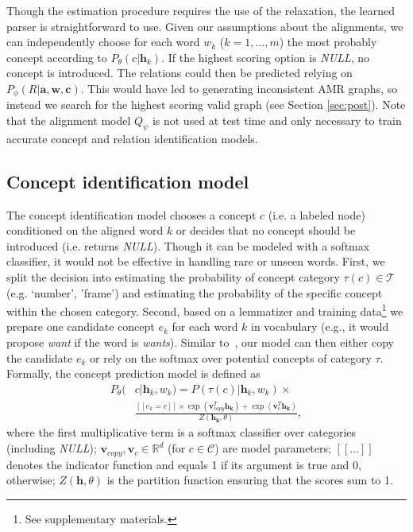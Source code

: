 \documentclass[11pt,a4paper]{article}
\begin{document}
Though the estimation procedure requires the use of the relaxation, the learned parser is straightforward to use. Given our assumptions about the alignments, we can independently choose for each word $w_k$ ($k = 1, \ldots, m$) the most probably concept according to $P_\theta(c| \mathbf{h}_{k})$. If the highest scoring option is {\it NULL}, no concept is introduced. The relations could then be predicted relying on $P_\phi(R | \mathbf{a}, \mathbf{w}, \mathbf{c})$. This would have led to generating inconsistent AMR graphs, so instead we search for the highest scoring valid graph (see Section  \ref{sec:post}). Note that the alignment model $Q_\psi$ is not used at test time and only necessary to train accurate concept and relation identification models.



\subsection{Concept identification model}
\label{sect:concept-ident}

The concept identification model chooses a concept $c$ (i.e. a labeled node) conditioned on the aligned word $k$ or decides that no concept should be introduced (i.e. returns \textit{NULL}). Though it can be modeled with a softmax classifier, it would not be effective in handling rare or unseen words. First, we split the decision into estimating the probability of concept category $\tau(c) \in \mathcal{T}$ (e.g. `number', 'frame') and estimating the probability of the specific concept within the chosen category. Second, based on a lemmatizer and training data\footnote{See supplementary materials.}
we prepare one candidate concept $e_k$ for each word $k$ in vocabulary (e.g., it would propose {\it want} if the word is {\it wants}).  Similar to~, our  model can then either copy the candidate $e_k$  or rely on the softmax over potential concepts of category $\tau$. Formally, the concept prediction model is defined as
\begin{align}
\nonumber
P_\theta(&c | \mathbf{h}_k, w_k) = P(\tau(c) | \mathbf{h}_k, w_k) \times \\
\nonumber
&
\frac{
  [[e_k = c ]] \times \exp( \mathbf{v}_{copy}^T \mathbf{h_k}) + \exp(\mathbf{v}_{c}^T\mathbf{h_k}) 
}{
 Z(\mathbf{h_k}, \theta)
},
\end{align}
where the first multiplicative term is a softmax classifier over categories (including {\it NULL}); $\mathbf{v}_{copy}, \mathbf{v}_{c} \in \mathbb{R}^d$ (for $c \in \mathcal{C}$) are model parameters; $[[\ldots]]$ denotes the indicator function and equals 1 if its argument is true and 0, otherwise; $Z(\mathbf{h}, \theta)$ is the partition function ensuring that the scores sum to 1. 
\end{document}
